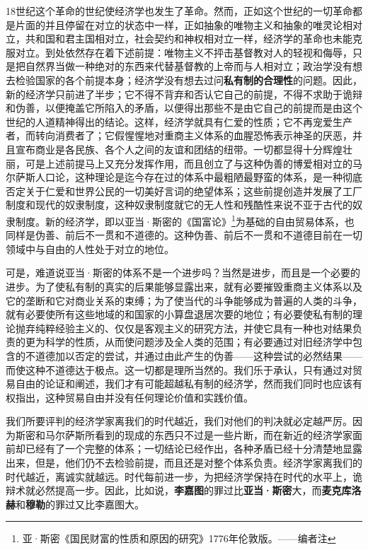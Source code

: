\documentclass[a4paper,twoside,12pt,AutoFakeBold]{ctexart}
\begin{document}
18世纪这个革命的世纪使经济学也发生了革命。然而，正如这个世纪的一切革命都是片面的并且停留在对立的状态中一样，正如抽象的唯物主义和抽象的唯灵论相对立，共和国和君主国相对立，社会契约和神权相对立一样，经济学的革命也未能克服对立。到处依然存在着下述前提：唯物主义不抨击基督教对人的轻视和侮辱，只是把自然界当做一种绝对的东西来代替基督教的上帝而与人相对立；政治学没有想去检验国家的各个前提本身；经济学没有想去过问\textbf{私有制的合理性}的问题。因此，新的经济学只前进了半步；它不得不背弃和否认它自己的前提，不得不求助于诡辩和伪善，以便掩盖它所陷入的矛盾，以便得出那些不是由它自己的前提而是由这个世纪的人道精神得出的结论。这样，经济学就具有仁爱的性质；它不再宠爱生产者，而转向消费者了；它假惺惺地对重商主义体系的血腥恐怖表示神圣的厌恶，并且宣布商业是各民族、各个人之间的友谊和团结的纽带。一切都显得十分辉煌壮丽，可是上述前提马上又充分发挥作用，而且创立了与这种伪善的博爱相对立的马尔萨斯人口论，这种理论是迄今存在过的体系中最粗陋最野蛮的体系，是一种彻底否定关于仁爱和世界公民的一切美好言词的绝望体系；这些前提创造并发展了工厂制度和现代的奴隶制度，这种奴隶制度就它的无人性和残酷性来说不亚于古代的奴隶制度。新的经济学，即以亚当·斯密的《国富论》\footnote{亚·斯密《国民财富的性质和原因的研究》1776年伦敦版。——编者注}为基础的自由贸易体系，也同样是伪善、前后不一贯和不道德的。这种伪善、前后不一贯和不道德目前在一切领域中与自由的人性处于对立的地位。

可是，难道说亚当·斯密的体系不是一个进步吗？当然是进步，而且是一个必要的进步。为了使私有制的真实的后果能够显露出来，就有必要摧毁重商主义体系以及它的垄断和它对商业关系的束缚；为了使当代的斗争能够成为普遍的人类的斗争，就有必要使所有这些地域的和国家的小算盘退居次要的地位；有必要使私有制的理论抛弃纯粹经验主义的、仅仅是客观主义的研究方法，并使它具有一种也对结果负责的更为科学的性质，从而使问题涉及全人类的范围；有必要通过对旧经济学中包含的不道德加以否定的尝试，并通过由此产生的伪善——这种尝试的必然结果——而使这种不道德达于极点。这一切都是理所当然的。我们乐于承认，只有通过对贸易自由的论证和阐述，我们才有可能超越私有制的经济学，然而我们同时也应该有权指出，这种贸易自由并没有任何理论价值和实践价值。

我们所要评判的经济学家离我们的时代越近，我们对他们的判决就必定越严厉。因为斯密和马尔萨斯所看到的现成的东西只不过是一些片断，而在新近的经济学家面前却已经有了一个完整的体系；一切结论已经作出，各种矛盾已经十分清楚地显露出来，但是，他们仍不去检验前提，而且还是对整个体系负责。经济学家离我们的时代越近，离诚实就越远。时代每前进一步，为把经济学保持在时代的水平上，诡辩术就必然提高一步。因此，比如说，\textbf{李嘉图}的罪过比\textbf{亚当·斯密}大，而\textbf{麦克库洛赫}和\textbf{穆勒}的罪过又比李嘉图大。
\end{document}
